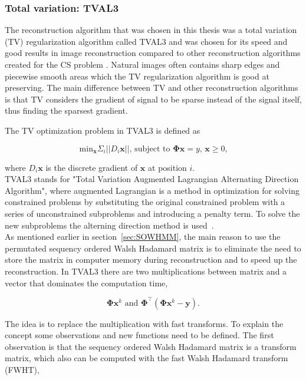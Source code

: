\subsubsection{Total variation: TVAL3}
\label{sec:TV}
The reconstruction algorithm that was chosen in this thesis was a total variation (TV) regularization algorithm called TVAL3 and was chosen for its speed and good results in image reconstruction compared to other reconstruction algorithms created for the CS problem \cite{article:TVAL3}. Natural images often contains sharp edges and piecewise smooth areas which the TV regularization algorithm is good at preserving. The main difference between TV and other reconstruction algorithms is that TV considers the gradient of signal to be sparse instead of the signal itself, thus finding the sparsest gradient. 

The TV optimization problem in TVAL3 is defined as  

\begin{equation}
\text{min}_\mathbf{x} \Sigma_i ||D_i \mathbf{x} || \text{, subject to } \mathbf{\Phi x} = 	y \text{, } \mathbf{x} \geq 0 \text{,} 
\label{eq:tval3}
\end{equation}

where $D_i\mathbf{x}$ is the discrete gradient of $\mathbf{x}$ at position $i$.\\[0.1in]

TVAL3 stands for "Total Variation Augmented Lagrangian Alternating Direction Algorithm", where augmented Lagrangian is a method in optimization for solving constrained problems by substituting the original constrained problem with a series of unconstrained subproblems and introducing a penalty term. To solve the new subproblems the alterning direction method is used~\cite{article:TVAL3}.\\[0.1in]

As mentioned earlier in section~\ref{sec:SOWHMM}, the main reason to use the permutated sequency ordered Walsh Hadamard matrix is to eliminate the need to store the matrix in computer memory during reconstruction and to speed up the reconstruction. In TVAL3 there are two multiplications between matrix and a vector that dominates the computation time,

\begin{equation}
\mathbf{\Phi}\mathbf{x}^k \text{ and } \mathbf{\Phi}^\top(\mathbf{\Phi}\mathbf{x}^k-\mathbf{y})\text{.}
\end{equation}

The idea is to replace the multiplication with fast transforms. To explain the concept some observations and new functions need to be defined. The first observation is that the sequency ordered Walsh Hadamard matrix is a transform matrix, which also can be computed with the fast Walsh Hadamard transform (FWHT),

